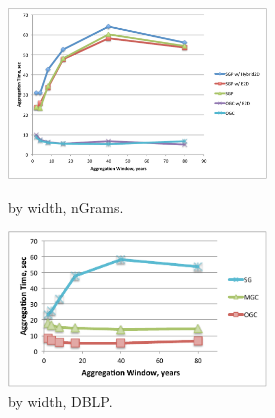 \begin{figure}[t]
\centering
\begin{minipage}{3in}
  \centering
  \includegraphics[width=2.7in]{figs/tgroupewidth.pdf}
\vspace{-0.1in}
  \caption{ by width, nGrams.}
  \label{fig:tgroup_width}
\vspace{-0.1in}
\end{minipage}
\begin{minipage}{3in}
  \centering
  \includegraphics[width=2.7in]{figs/tgroupewidth_dblp.pdf}
\vspace{-0.1in}
  \caption{ by width, DBLP.}
  \label{fig:tgroup_width_dblp}
\vspace{-0.1in}
\end{minipage}
\end{figure}

